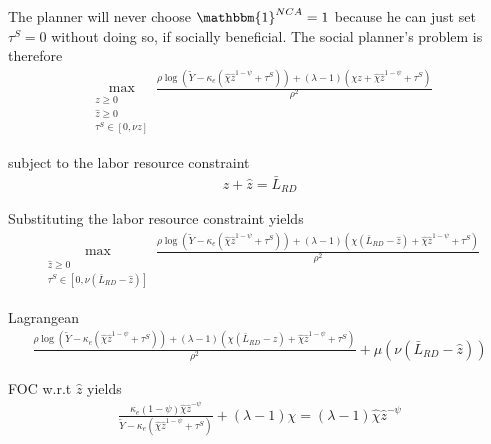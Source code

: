 \documentclass[11pt,english]{article}
\begin{document}
The planner will never choose $\mathbbm{1}^{NCA} = 1$ because he can just set $\tau^S = 0$ without doing so, if socially beneficial. The social planner's problem is therefore
\begin{align}
	\max_{\substack{z \ge 0 \\ \hat{z} \ge 0 \\ \tau^S \in [0,\nu z]}}  \frac{\rho \log (\tilde{Y} - \kappa_e (\hat{\chi} \hat{z}^{1-\psi}+ \tau^S)) + (\lambda -1) (\chi z + \hat{\chi} \hat{z}^{1-\psi} + \tau^S)}{\rho^2}
\end{align}

subject to the labor resource constraint
\begin{align}
	z + \hat{z} = \bar{L}_{RD}
\end{align}

Substituting the labor resource constraint yields
\begin{align}
\max_{\substack{\hat{z} \ge 0 \\ \tau^S \in [0,\nu (\bar{L}_{RD} - \hat{z})]}}  \frac{\rho \log (\tilde{Y} - \kappa_e (\hat{\chi} \hat{z}^{1-\psi}+ \tau^S)) + (\lambda -1) (\chi (\bar{L}_{RD} - \hat{z}) + \hat{\chi} \hat{z}^{1-\psi} + \tau^S)}{\rho^2}
\end{align}

Lagrangean
\begin{align}
 \frac{\rho \log (\tilde{Y} - \kappa_e (\hat{\chi} \hat{z}^{1-\psi}+ \tau^S)) + (\lambda -1) (\chi (\bar{L}_{RD} - \hat{z}) + \hat{\chi} \hat{z}^{1-\psi} + \tau^S)}{\rho^2} + \mu (\nu (\bar{L}_{RD} - \hat{z})) 
\end{align}

FOC w.r.t $\hat{z}$ yields
\begin{align}
	\frac{\kappa_e (1-\psi)\hat{\chi} \hat{z}^{-\psi} }{\tilde{Y} - \kappa_e (\hat{\chi} \hat{z}^{1-\psi} + \tau^S)} +  (\lambda -1) \chi = (\lambda -1) \hat{\chi} \hat{z}^{-\psi}
\end{align}
\end{document}
